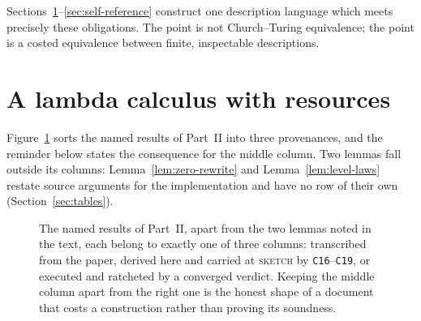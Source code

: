 Sections~\ref{sec:resource-lambda}--\ref{sec:self-reference} construct one
description language which meets precisely these obligations.  The point is
not Church--Turing equivalence; the point is a costed equivalence between
finite, inspectable descriptions.


\section{A lambda calculus with resources}
\label{sec:resource-lambda}

Figure~\ref{fig:three-provenances} sorts the named results of Part~II into
three provenances, and the reminder below states the consequence for the
middle column.  Two lemmas fall outside its columns:
Lemma~\ref{lem:zero-rewrite} and Lemma~\ref{lem:level-laws} restate source
arguments for the implementation and have no row of their own
(Section~\ref{sec:tables}).
\begin{figure}[H]
\centering

\caption{The named results of Part~II, apart from the two lemmas noted in the text, each belong to exactly one of three columns: transcribed from the paper, derived here and carried at \textsc{sketch} by \texttt{C16}--\texttt{C19}, or executed and ratcheted by a converged verdict.  Keeping the middle column apart from the right one is the honest shape of a document that costs a construction rather than proving its soundness.}
\label{fig:three-provenances}
\end{figure}

